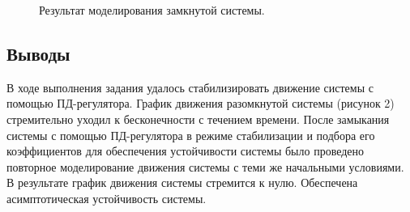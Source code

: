 \documentclass[a5paper, 10pt]{article}
\theoremstyle{definition}
\theoremstyle{plain}
\theoremstyle{remark}
\begin{document}
\begin{figure}[h!]
\caption{Результат моделирования замкнутой системы.}
\end{figure}

\subsection{Выводы}
В ходе выполнения задания удалось стабилизировать движение системы с помощью ПД-регулятора. График движения разомкнутой системы (рисунок 2) стремительно уходил к бесконечности с течением времени. После замыкания системы с помощью ПД-регулятора в режиме стабилизации и подбора его коэффициентов для обеспечения устойчивости системы было проведено повторное моделирование движения системы с теми же начальными условиями. В результате график движения системы стремится к нулю. Обеспечена асимптотическая устойчивость системы.
\end{document}
